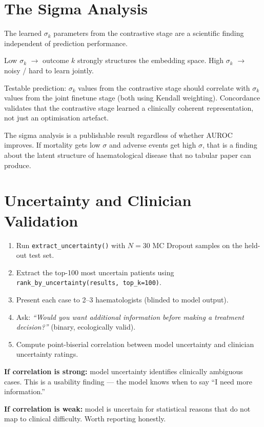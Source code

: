 \documentclass[11pt, a4paper]{article}
\newcommand{\code}[1]{\texttt{\small #1}}
\begin{document}
\section{The Sigma Analysis}
\label{sec:sigma}

The learned $\sigma_k$ parameters from the contrastive stage are a
scientific finding independent of prediction performance.

\begin{tcolorbox}[planbox, title=Sigma interpretation]
  Low $\sigma_k$ $\rightarrow$ outcome $k$ strongly structures the
  embedding space. High $\sigma_k$ $\rightarrow$ noisy / hard to learn jointly.

  \medskip
  Testable prediction: $\sigma_k$ values from the contrastive stage
  should correlate with $\sigma_k$ values from the joint finetune stage
  (both using Kendall weighting). Concordance validates that the
  contrastive stage learned a clinically coherent representation, not
  just an optimisation artefact.
\end{tcolorbox}

The sigma analysis is a publishable result regardless of whether AUROC
improves. If mortality gets low $\sigma$ and adverse events get high
$\sigma$, that is a finding about the latent structure of haematological
disease that no tabular paper can produce.

\section{Uncertainty and Clinician Validation}
\label{sec:uncertainty}

\begin{tcolorbox}[planbox, title=Clinician validation protocol]
  \begin{enumerate}[leftmargin=1.5em, itemsep=3pt]
    \item Run \code{extract\_uncertainty()} with $N=30$ MC Dropout samples
          on the held-out test set.
    \item Extract the top-100 most uncertain patients using
          \code{rank\_by\_uncertainty(results, top\_k=100)}.
    \item Present each case to 2--3 haematologists (blinded to model output).
    \item Ask: \emph{``Would you want additional information before making
          a treatment decision?''} (binary, ecologically valid).
    \item Compute point-biserial correlation between model uncertainty
          and clinician uncertainty ratings.
  \end{enumerate}

  \medskip
  \textbf{If correlation is strong:} model uncertainty identifies
  clinically ambiguous cases. This is a usability finding — the model
  knows when to say ``I need more information.''

  \textbf{If correlation is weak:} model is uncertain for statistical
  reasons that do not map to clinical difficulty. Worth reporting honestly.
\end{tcolorbox}
\end{document}
